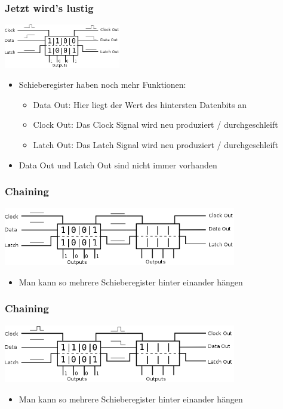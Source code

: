 \documentclass[ngerman,compress]{beamer}
\begin{document}
\begin{frame} [fragile]
	\frametitle{Jetzt wird's lustig}
	\includegraphics[width=2in]{09_shift.png}
	\begin{itemize}
		\item Schieberegister haben noch mehr Funktionen:
		\begin{itemize}
			\item Data Out: Hier liegt der Wert des hintersten Datenbits an
			\item Clock Out: Das Clock Signal wird neu produziert / durchgeschleift
			\item Latch Out: Das Latch Signal wird neu produziert / durchgeschleift
		\end{itemize}
		\item Data Out und Latch Out sind nicht immer vorhanden
	\end{itemize}
\end{frame}

\begin{frame} [fragile]
	\frametitle{Chaining}
	\includegraphics[width=4in]{10_chaining.png}
	\pause
	\begin{itemize}
		\item Man kann so mehrere Schieberegister hinter einander hängen
	\end{itemize}
\end{frame}

\begin{frame} [fragile]
	\frametitle{Chaining}
	\includegraphics[width=4in]{11_chaining.png}
	\begin{itemize}
		\item Man kann so mehrere Schieberegister hinter einander hängen
	\end{itemize}
\end{frame}
\end{document}
